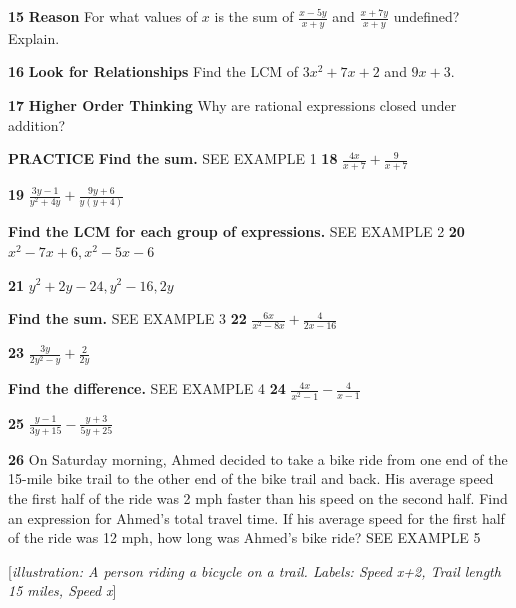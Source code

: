 \documentclass{article}
\newenvironment{practice}[2]{\textbf{#1}\quad}{\par}
\newcommand{\answer}[1]{}
\newcommand{\placeholder}[2]{[\textit{#1: #2}]}
\begin{document}
\begin{practice}{15}{unknown}
\textbf{Reason} For what values of $x$ is the sum of $\frac{x - 5y}{x + y}$ and $\frac{x + 7y}{x + y}$ undefined? Explain.
\answer{}
\end{practice}

\begin{practice}{16}{unknown}
\textbf{Look for Relationships} Find the LCM of $3x^2 + 7x + 2$ and $9x + 3$.
\answer{}
\end{practice}

\begin{practice}{17}{unknown}
\textbf{Higher Order Thinking} Why are rational expressions closed under addition?
\answer{}
\end{practice}

\textbf{PRACTICE}
\textbf{Find the sum.} SEE EXAMPLE 1
\begin{practice}{18}{unknown}
$\frac{4x}{x + 7} + \frac{9}{x + 7}$
\answer{}
\end{practice}
\begin{practice}{19}{unknown}
$\frac{3y - 1}{y^2 + 4y} + \frac{9y + 6}{y(y + 4)}$
\answer{}
\end{practice}

\textbf{Find the LCM for each group of expressions.} SEE EXAMPLE 2
\begin{practice}{20}{unknown}
$x^2 - 7x + 6, x^2 - 5x - 6$
\answer{}
\end{practice}
\begin{practice}{21}{unknown}
$y^2 + 2y - 24, y^2 - 16, 2y$
\answer{}
\end{practice}

\textbf{Find the sum.} SEE EXAMPLE 3
\begin{practice}{22}{unknown}
$\frac{6x}{x^2 - 8x} + \frac{4}{2x - 16}$
\answer{}
\end{practice}
\begin{practice}{23}{unknown}
$\frac{3y}{2y^2 - y} + \frac{2}{2y}$
\answer{}
\end{practice}

\textbf{Find the difference.} SEE EXAMPLE 4
\begin{practice}{24}{unknown}
$\frac{4x}{x^2 - 1} - \frac{4}{x - 1}$
\answer{}
\end{practice}
\begin{practice}{25}{unknown}
$\frac{y - 1}{3y + 15} - \frac{y + 3}{5y + 25}$
\answer{}
\end{practice}

\begin{practice}{26}{unknown}
On Saturday morning, Ahmed decided to take a bike ride from one end of the 15-mile bike trail to the other end of the bike trail and back. His average speed the first half of the ride was 2 mph faster than his speed on the second half. Find an expression for Ahmed's total travel time. If his average speed for the first half of the ride was 12 mph, how long was Ahmed's bike ride? SEE EXAMPLE 5

\placeholder{illustration}{A person riding a bicycle on a trail. Labels: Speed x+2, Trail length 15 miles, Speed x}
\answer{}
\end{practice}
\end{document}
